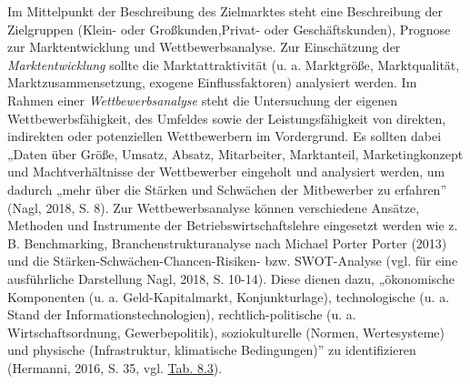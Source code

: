 \documentclass[
  letterpaper,
]{book}
\begin{document}
Im Mittelpunkt der Beschreibung des Zielmarktes steht eine Beschreibung
der Zielgruppen (Klein- oder Großkunden,Privat- oder Geschäftskunden),
Prognose zur Marktentwicklung und Wettbewerbsanalyse. Zur Einschätzung
der \emph{Marktentwicklung }sollte die Marktattraktivität (u. a.
Marktgröße, Marktqualität, Marktzusammensetzung, exogene
Einflussfaktoren) analysiert werden. Im Rahmen einer
\emph{Wettbewerbsanalyse }steht die Untersuchung der eigenen
Wettbewerbsfähigkeit, des Umfeldes sowie der Leistungsfähigkeit von
direkten, indirekten oder potenziellen Wettbewerbern im Vordergrund. Es
sollten dabei „Daten über Größe, Umsatz, Absatz, Mitarbeiter,
Marktanteil, Marketingkonzept und Machtverhältnisse der Wettbewerber
eingeholt und analysiert werden, um dadurch „mehr über die Stärken und
Schwächen der Mitbewerber zu erfahren'' (Nagl, 2018, S. 8). Zur
Wettbewerbsanalyse können verschiedene Ansätze, Methoden und Instrumente
der Betriebswirtschaftslehre eingesetzt werden wie z. B. Benchmarking,
Branchenstrukturanalyse nach Michael Porter Porter (2013) und die
Stärken-Schwächen-Chancen-Risiken- bzw. SWOT-Analyse (vgl. für eine
ausführliche Darstellung Nagl, 2018, S. 10-14). Diese dienen dazu,
„ökonomische Komponenten (u. a. Geld-Kapitalmarkt, Konjunkturlage),
technologische (u. a. Stand der Informationstechnologien),
rechtlich-politische (u. a. Wirtschaftsordnung, Gewerbepolitik),
soziokulturelle (Normen, Wertesysteme) und physische (Infrastruktur,
klimatische Bedingungen)'' zu identifizieren (Hermanni, 2016, S. 35,
vgl. \hyperref[table83]{Tab. 8.3}).
\end{document}
